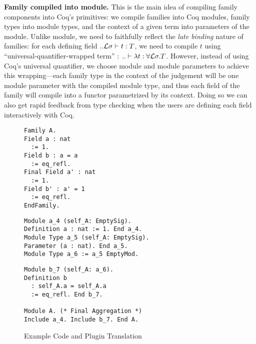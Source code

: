\textbf{Family compiled into module.} This is the main idea of compiling
family components into Coq's primitives: we compile families into Coq
modules, family types into module types, and the context of a given term
into parameters of the module. Unlike module, we need to faithfully
reflect the \textit{late binding} nature of families: for each defining
field $ .. {\mathcal{L}}\sigma \vdash t : T $, we need to compile $t$ using
``universal-quantifier-wrapped term'' : $.. \vdash \lambda t : \forall
{\mathcal{L}} \sigma. T$. However, instead of using Coq's universal quantifier, we
choose module and module parameters to achieve this wrapping---each
family type in the context of the judgement will be one module parameter
with the compiled module type, and thus each field of the family will
compile into a functor parametrized by its context. Doing so we can also
get rapid feedback from type checking when the users are defining each
field interactively with Coq.
\begin{figure}[!htb]
  \begin{minipage}[t]{0.25\linewidth}
\begin{verbatim}
Family A.
Field a : nat 
  := 1.
Field b : a = a
  := eq_refl.
Final Field a' : nat 
  := 1. 
Field b' : a' = 1
  := eq_refl.
EndFamily.
\end{verbatim}
  \end{minipage}%
  \begin{minipage}[t]{0.4\linewidth}
\begin{verbatim}
Module a_4 (self_A: EmptySig).
Definition a : nat := 1. End a_4.
Module Type a_5 (self_A: EmptySig).
Parameter (a : nat). End a_5.
Module Type a_6 := a_5 EmptyMod.
\end{verbatim}
  \end{minipage}
  \begin{minipage}[t]{0.3\linewidth}
\begin{verbatim}
Module b_7 (self_A: a_6).
Definition b 
  : self_A.a = self_A.a 
  := eq_refl. End b_7.
  
Module A. (* Final Aggregation *)
Include a_4. Include b_7. End A.
\end{verbatim}
  \end{minipage}
  \caption{Example Code and Plugin Translation}\label{fig:plugin-example1}
\end{figure}



